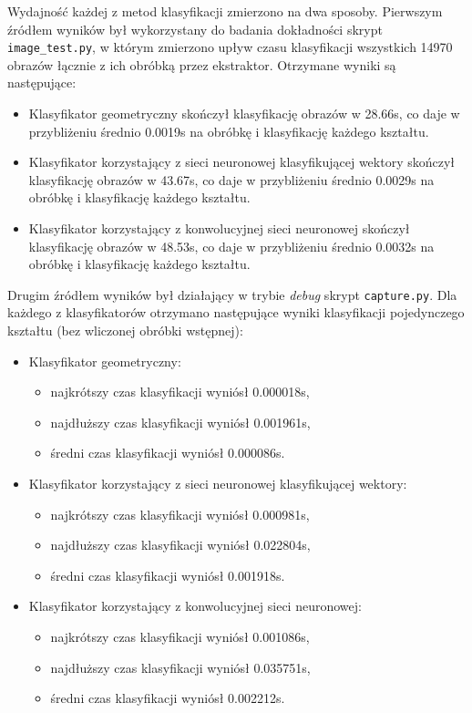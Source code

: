 \documentclass[11pt,a4paper]{article}
\begin{document}
Wydajność każdej z metod klasyfikacji zmierzono na dwa sposoby. Pierwszym źródłem wyników był wykorzystany do badania dokładności skrypt \verb+image_test.py+, w którym zmierzono upływ czasu klasyfikacji wszystkich 14970 obrazów łącznie z ich obróbką przez ekstraktor. Otrzymane wyniki są następujące:
\begin{itemize}
    \item Klasyfikator geometryczny skończył klasyfikację obrazów w 28.66s, co daje w przybliżeniu średnio 0.0019s na obróbkę i klasyfikację każdego kształtu.
    \item Klasyfikator korzystający z sieci neuronowej klasyfikującej wektory skończył klasyfikację obrazów w 43.67s, co daje w przybliżeniu średnio 0.0029s na obróbkę i klasyfikację każdego kształtu.
    \item Klasyfikator korzystający z konwolucyjnej sieci neuronowej skończył klasyfikację obrazów w 48.53s, co daje w przybliżeniu średnio 0.0032s na obróbkę i klasyfikację każdego kształtu.
\end{itemize}

Drugim źródłem wyników był działający w trybie \emph{debug} skrypt \verb+capture.py+. Dla każdego z klasyfikatorów otrzymano następujące wyniki klasyfikacji pojedynczego kształtu (bez wliczonej obróbki wstępnej):
\begin{itemize}
    \item Klasyfikator geometryczny:
    \begin{itemize}
        \item najkrótszy czas klasyfikacji wyniósł 0.000018s,
        \item najdłuższy czas klasyfikacji wyniósł 0.001961s,
        \item średni czas klasyfikacji wyniósł 0.000086s.
    \end{itemize}
    \item Klasyfikator korzystający z sieci neuronowej klasyfikującej wektory:
    \begin{itemize}
        \item najkrótszy czas klasyfikacji wyniósł 0.000981s,
        \item najdłuższy czas klasyfikacji wyniósł 0.022804s,
        \item średni czas klasyfikacji wyniósł 0.001918s.
    \end{itemize}
    \item Klasyfikator korzystający z konwolucyjnej sieci neuronowej:
    \begin{itemize}
        \item najkrótszy czas klasyfikacji wyniósł 0.001086s,
        \item najdłuższy czas klasyfikacji wyniósł 0.035751s,
        \item średni czas klasyfikacji wyniósł 0.002212s.
    \end{itemize}
\end{itemize}
\end{document}
